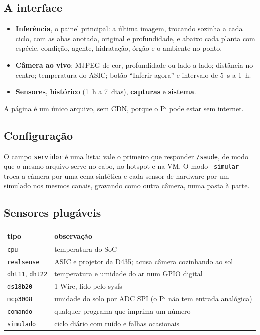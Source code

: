 \documentclass[11pt,a4paper]{article}
\newcommand{\cod}[1]{\texttt{#1}}
\begin{document}
\subsection{A interface}
\begin{itemize}
  \item \textbf{Inferência}, o painel principal: a última imagem, trocando sozinha a
  cada ciclo, com as abas anotada, original e profundidade, e abaixo cada planta com
  espécie, condição, agente, hidratação, órgão e o ambiente no ponto.
  \item \textbf{Câmera ao vivo}: MJPEG de cor, profundidade ou lado a lado; distância
  no centro; temperatura do ASIC; botão ``Inferir agora'' e intervalo de 5~s a 1~h.
  \item \textbf{Sensores}, \textbf{histórico} (1~h a 7~dias), \textbf{capturas} e
  \textbf{sistema}.
\end{itemize}
A página é um único arquivo, sem CDN, porque o Pi pode estar sem internet.

\subsection{Configuração}
O campo \cod{servidor} é uma lista: vale o primeiro que responder \cod{/saude}, de
modo que o mesmo arquivo serve no cabo, no hotspot e na VM. O modo \cod{--simular}
troca a câmera por uma cena sintética e cada sensor de hardware por um simulado nos
mesmos canais, gravando como outra câmera, numa pasta à parte.

\subsection{Sensores plugáveis}
\begin{table}[h]
\centering\small
\begin{tabularx}{\linewidth}{@{}lX@{}}
\toprule
tipo & observação \\
\midrule
\cod{cpu} & temperatura do SoC \\
\cod{realsense} & ASIC e projetor da D435; acusa câmera cozinhando ao sol \\
\cod{dht11}, \cod{dht22} & temperatura e umidade do ar num GPIO digital \\
\cod{ds18b20} & 1-Wire, lido pelo sysfs \\
\cod{mcp3008} & umidade do solo por ADC SPI (o Pi não tem entrada analógica) \\
\cod{comando} & qualquer programa que imprima um número \\
\cod{simulado} & ciclo diário com ruído e falhas ocasionais \\
\bottomrule
\end{tabularx}
\end{table}
\end{document}
